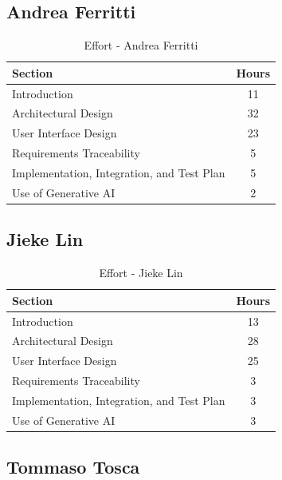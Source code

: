 \subsection*{Andrea Ferritti}

\begin{table}[H]
    \centering
\begin{tabular}{|l|c|}
        \hline
        \textbf{Section} & \textbf{Hours} \\ \hline
        Introduction & 11 \\ \hline
        Architectural Design & 32\\ \hline
        User Interface Design & 23\\ \hline
        Requirements Traceability & 5 \\ \hline
        Implementation, Integration, and Test Plan & 5 \\ \hline
        Use of Generative AI & 2 \\ \hline
    \end{tabular}
    \caption{Effort - Andrea Ferritti}
    \label{tab:effortferritti}
\end{table}

\subsection*{Jieke Lin}

\begin{table}[H]
    \centering
\begin{tabular}{|l|c|}
        \hline
        \textbf{Section} & \textbf{Hours} \\ \hline
        Introduction & 13 \\ \hline
        Architectural Design & 28\\ \hline
        User Interface Design & 25\\ \hline
        Requirements Traceability & 3 \\ \hline
        Implementation, Integration, and Test Plan & 3\\ \hline
        Use of Generative AI & 3 \\ \hline
    \end{tabular}
    \caption{Effort - Jieke Lin}
    \label{tab:effortlin}
\end{table}

\subsection*{Tommaso Tosca}


